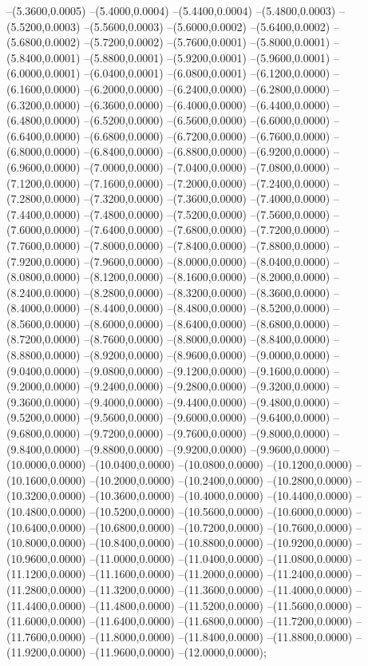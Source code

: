 {	--(5.3600,0.0005)
	--(5.4000,0.0004)
	--(5.4400,0.0004)
	--(5.4800,0.0003)
	--(5.5200,0.0003)
	--(5.5600,0.0003)
	--(5.6000,0.0002)
	--(5.6400,0.0002)
	--(5.6800,0.0002)
	--(5.7200,0.0002)
	--(5.7600,0.0001)
	--(5.8000,0.0001)
	--(5.8400,0.0001)
	--(5.8800,0.0001)
	--(5.9200,0.0001)
	--(5.9600,0.0001)
	--(6.0000,0.0001)
	--(6.0400,0.0001)
	--(6.0800,0.0001)
	--(6.1200,0.0000)
	--(6.1600,0.0000)
	--(6.2000,0.0000)
	--(6.2400,0.0000)
	--(6.2800,0.0000)
	--(6.3200,0.0000)
	--(6.3600,0.0000)
	--(6.4000,0.0000)
	--(6.4400,0.0000)
	--(6.4800,0.0000)
	--(6.5200,0.0000)
	--(6.5600,0.0000)
	--(6.6000,0.0000)
	--(6.6400,0.0000)
	--(6.6800,0.0000)
	--(6.7200,0.0000)
	--(6.7600,0.0000)
	--(6.8000,0.0000)
	--(6.8400,0.0000)
	--(6.8800,0.0000)
	--(6.9200,0.0000)
	--(6.9600,0.0000)
	--(7.0000,0.0000)
	--(7.0400,0.0000)
	--(7.0800,0.0000)
	--(7.1200,0.0000)
	--(7.1600,0.0000)
	--(7.2000,0.0000)
	--(7.2400,0.0000)
	--(7.2800,0.0000)
	--(7.3200,0.0000)
	--(7.3600,0.0000)
	--(7.4000,0.0000)
	--(7.4400,0.0000)
	--(7.4800,0.0000)
	--(7.5200,0.0000)
	--(7.5600,0.0000)
	--(7.6000,0.0000)
	--(7.6400,0.0000)
	--(7.6800,0.0000)
	--(7.7200,0.0000)
	--(7.7600,0.0000)
	--(7.8000,0.0000)
	--(7.8400,0.0000)
	--(7.8800,0.0000)
	--(7.9200,0.0000)
	--(7.9600,0.0000)
	--(8.0000,0.0000)
	--(8.0400,0.0000)
	--(8.0800,0.0000)
	--(8.1200,0.0000)
	--(8.1600,0.0000)
	--(8.2000,0.0000)
	--(8.2400,0.0000)
	--(8.2800,0.0000)
	--(8.3200,0.0000)
	--(8.3600,0.0000)
	--(8.4000,0.0000)
	--(8.4400,0.0000)
	--(8.4800,0.0000)
	--(8.5200,0.0000)
	--(8.5600,0.0000)
	--(8.6000,0.0000)
	--(8.6400,0.0000)
	--(8.6800,0.0000)
	--(8.7200,0.0000)
	--(8.7600,0.0000)
	--(8.8000,0.0000)
	--(8.8400,0.0000)
	--(8.8800,0.0000)
	--(8.9200,0.0000)
	--(8.9600,0.0000)
	--(9.0000,0.0000)
	--(9.0400,0.0000)
	--(9.0800,0.0000)
	--(9.1200,0.0000)
	--(9.1600,0.0000)
	--(9.2000,0.0000)
	--(9.2400,0.0000)
	--(9.2800,0.0000)
	--(9.3200,0.0000)
	--(9.3600,0.0000)
	--(9.4000,0.0000)
	--(9.4400,0.0000)
	--(9.4800,0.0000)
	--(9.5200,0.0000)
	--(9.5600,0.0000)
	--(9.6000,0.0000)
	--(9.6400,0.0000)
	--(9.6800,0.0000)
	--(9.7200,0.0000)
	--(9.7600,0.0000)
	--(9.8000,0.0000)
	--(9.8400,0.0000)
	--(9.8800,0.0000)
	--(9.9200,0.0000)
	--(9.9600,0.0000)
	--(10.0000,0.0000)
	--(10.0400,0.0000)
	--(10.0800,0.0000)
	--(10.1200,0.0000)
	--(10.1600,0.0000)
	--(10.2000,0.0000)
	--(10.2400,0.0000)
	--(10.2800,0.0000)
	--(10.3200,0.0000)
	--(10.3600,0.0000)
	--(10.4000,0.0000)
	--(10.4400,0.0000)
	--(10.4800,0.0000)
	--(10.5200,0.0000)
	--(10.5600,0.0000)
	--(10.6000,0.0000)
	--(10.6400,0.0000)
	--(10.6800,0.0000)
	--(10.7200,0.0000)
	--(10.7600,0.0000)
	--(10.8000,0.0000)
	--(10.8400,0.0000)
	--(10.8800,0.0000)
	--(10.9200,0.0000)
	--(10.9600,0.0000)
	--(11.0000,0.0000)
	--(11.0400,0.0000)
	--(11.0800,0.0000)
	--(11.1200,0.0000)
	--(11.1600,0.0000)
	--(11.2000,0.0000)
	--(11.2400,0.0000)
	--(11.2800,0.0000)
	--(11.3200,0.0000)
	--(11.3600,0.0000)
	--(11.4000,0.0000)
	--(11.4400,0.0000)
	--(11.4800,0.0000)
	--(11.5200,0.0000)
	--(11.5600,0.0000)
	--(11.6000,0.0000)
	--(11.6400,0.0000)
	--(11.6800,0.0000)
	--(11.7200,0.0000)
	--(11.7600,0.0000)
	--(11.8000,0.0000)
	--(11.8400,0.0000)
	--(11.8800,0.0000)
	--(11.9200,0.0000)
	--(11.9600,0.0000)
	--(12.0000,0.0000);
}
